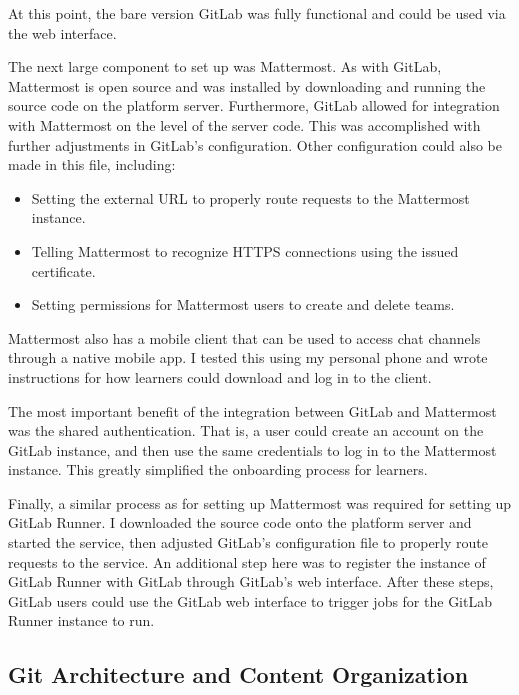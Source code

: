 \documentclass[12pt,twoside]{mitthesis}
\begin{document}
{At this point, the bare version GitLab was fully functional and could be used via the web interface.

The next large component to set up was Mattermost. As with GitLab, Mattermost is open source and was installed by downloading and running the source code on the platform server. Furthermore, GitLab allowed for integration with Mattermost on the level of the server code. This was accomplished with further adjustments in GitLab's configuration. Other configuration could also be made in this file, including:
\begin{itemize}
\item Setting the external URL to properly route requests to the Mattermost instance.
\item Telling Mattermost to recognize HTTPS connections using the issued certificate.
\item Setting permissions for Mattermost users to create and delete teams.
\end{itemize}
Mattermost also has a mobile client that can be used to access chat channels through a native mobile app. I tested this using my personal phone and wrote instructions for how learners could download and log in to the client.

The most important benefit of the integration between GitLab and Mattermost was the shared authentication. That is, a user could create an account on the GitLab instance, and then use the same credentials to log in to the Mattermost instance. This greatly simplified the onboarding process for learners.

Finally, a similar process as for setting up Mattermost was required for setting up GitLab Runner. I downloaded the source code onto the platform server and started the service, then adjusted GitLab's configuration file to properly route requests to the service. An additional step here was to register the instance of GitLab Runner with GitLab through GitLab's web interface. After these steps, GitLab users could use the GitLab web interface to trigger jobs for the GitLab Runner instance to run.}

\subsection{Git Architecture and Content Organization}
\end{document}
